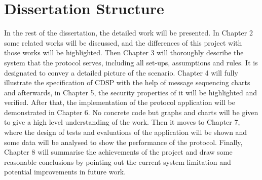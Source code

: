 \section{Dissertation Structure}
In the rest of the dissertation, the detailed work will be presented. In Chapter 2 some related works will be discussed, and the differences of this project with those works will be highlighted. Then Chapter 3 will thoroughly describe the system that the protocol serves, including all set-ups, assumptions and rules. It is designated to convey a detailed picture of the scenario. Chapter 4 will fully illustrate the specification of CDSP with the help of message sequencing charts and afterwards, in Chapter 5, the security properties of it will be highlighted and verified. After that, the implementation of the protocol application will be demonstrated in Chapter 6. No concrete code but graphs and charts will be given to give a high level understanding of the work. Then it moves to Chapter 7, where the design of tests and evaluations of the application will be shown and some data will be analysed to show the performance of the protocol. Finally, Chapter 8 will summarise the achievements of the project and draw some reasonable conclusions by pointing out the current system limitation and potential improvements in future work.